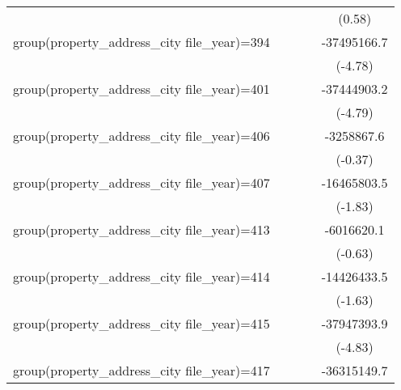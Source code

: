 {\begin{tabular}{l*{4}{c}}
                    &                     &                     &                     &      (0.58)         \\
\addlinespace
group(property\_address\_city file\_year)=394&                     &                     &                     & -37495166.7\sym{***}\\
                    &                     &                     &                     &     (-4.78)         \\
\addlinespace
group(property\_address\_city file\_year)=401&                     &                     &                     & -37444903.2\sym{***}\\
                    &                     &                     &                     &     (-4.79)         \\
\addlinespace
group(property\_address\_city file\_year)=406&                     &                     &                     &  -3258867.6         \\
                    &                     &                     &                     &     (-0.37)         \\
\addlinespace
group(property\_address\_city file\_year)=407&                     &                     &                     & -16465803.5         \\
                    &                     &                     &                     &     (-1.83)         \\
\addlinespace
group(property\_address\_city file\_year)=413&                     &                     &                     &  -6016620.1         \\
                    &                     &                     &                     &     (-0.63)         \\
\addlinespace
group(property\_address\_city file\_year)=414&                     &                     &                     & -14426433.5         \\
                    &                     &                     &                     &     (-1.63)         \\
\addlinespace
group(property\_address\_city file\_year)=415&                     &                     &                     & -37947393.9\sym{***}\\
                    &                     &                     &                     &     (-4.83)         \\
\addlinespace
group(property\_address\_city file\_year)=417&                     &                     &                     & -36315149.7\sym{***}\\

\end{tabular}}
